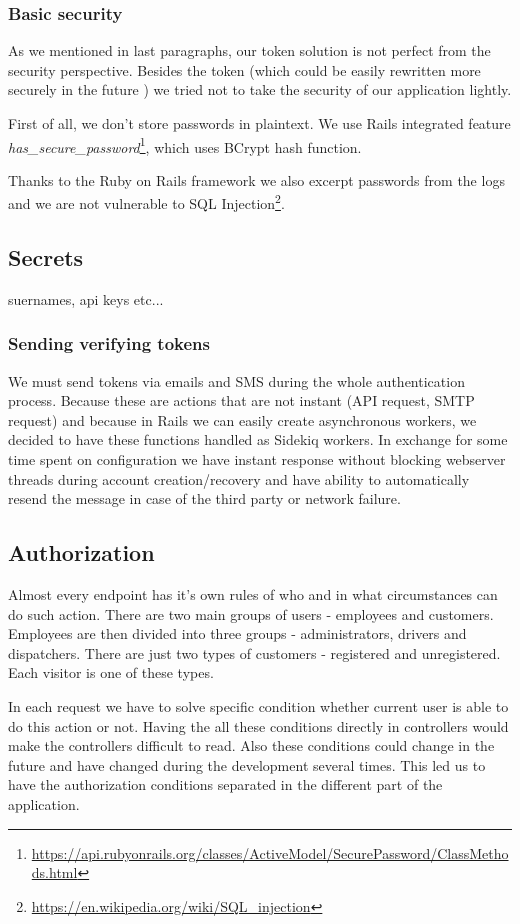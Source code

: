 \subsubsection{Basic security}
As we mentioned in last paragraphs, our token solution is not perfect from the security perspective. Besides the token (which could be easily rewritten more securely in the future ) we tried not to take the security of our application lightly.

First of all, we don't store passwords in plaintext. We use Rails integrated feature \textit{has\_secure\_password}\footnote{\url{https://api.rubyonrails.org/classes/ActiveModel/SecurePassword/ClassMethods.html}}, which uses BCrypt hash function.

Thanks to the Ruby on Rails framework we also excerpt passwords from the logs and we are not vulnerable to SQL Injection\footnote{\url{https://en.wikipedia.org/wiki/SQL\_injection}}.
\subsection{Secrets}
suernames, api keys etc...
\subsubsection{Sending verifying tokens}
We must send tokens via emails and SMS during the whole authentication process. Because these are actions that are not instant (API request, SMTP request) and because in Rails we can easily create asynchronous workers, we decided to have these functions handled as Sidekiq workers. In exchange for some time spent on configuration we have instant response without blocking webserver threads during account creation/recovery and have ability to automatically resend the message in case of the third party or network failure.

\subsection{Authorization}
Almost every endpoint has it's own rules of who and in what circumstances can do such action. There are two main groups of users - employees and customers. Employees are then divided into three groups - administrators, drivers and dispatchers. There are just two types of customers - registered and unregistered. Each visitor is one of these types.

In each request we have to solve specific condition whether current user is able to do this action or not. Having the all these conditions directly in controllers would make the controllers difficult to read. Also these conditions could change in the future and have changed during the development several times. This led us to have the authorization conditions separated in the different part of the application.

